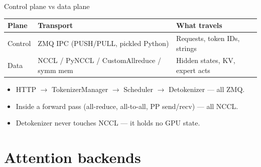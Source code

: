 \documentclass[aspectratio=169,10pt]{beamer}
\begin{document}
\begin{frame}{Control plane vs data plane}
  \centering
  \small
  \begin{tabular}{p{3.5cm} p{5.2cm} p{4.3cm}}
    \toprule
    \textbf{Plane} & \textbf{Transport} & \textbf{What travels} \\
    \midrule
    Control & \textcolor{slblue}{ZMQ IPC} (PUSH/PULL, pickled Python) & Requests, token IDs, strings \\[2pt]
    Data    & \textcolor{slred}{NCCL / PyNCCL / CustomAllreduce / symm mem} & Hidden states, KV, expert acts \\
    \bottomrule
  \end{tabular}
  \vspace{0.5cm}
  \begin{itemize}\footnotesize
    \item HTTP $\to$ TokenizerManager $\to$ Scheduler $\to$ Detokenizer --- all ZMQ.
    \item Inside a forward pass (all-reduce, all-to-all, PP send/recv) --- all NCCL.
    \item Detokenizer never touches NCCL --- it holds no GPU state.
  \end{itemize}
\end{frame}

\section{Attention backends}
\end{document}
